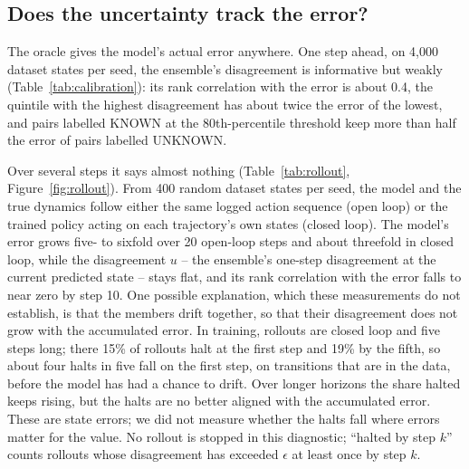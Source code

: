 \documentclass[11pt]{article}
\begin{document}
\subsection{Does the uncertainty track the error?}\label{sec:uncertainty}

The oracle gives the model's actual error anywhere. One step ahead, on 4{,}000 dataset states per seed, the ensemble's disagreement is informative but weakly (Table~\ref{tab:calibration}): its rank correlation with the error is about 0.4, the quintile with the highest disagreement has about twice the error of the lowest, and pairs labelled KNOWN at the 80th-percentile threshold keep more than half the error of pairs labelled UNKNOWN.

\begin{table}[h]
\centering\small
{}
\caption{One-step error of the hybrid ensemble against the true dynamics (Euclidean norm over the five process variables, normalized units), mean over seeds.}
\label{tab:calibration}
\end{table}

Over several steps it says almost nothing (Table~\ref{tab:rollout}, Figure~\ref{fig:rollout}). From 400 random dataset states per seed, the model and the true dynamics follow either the same logged action sequence (open loop) or the trained policy acting on each trajectory's own states (closed loop). The model's error grows five- to sixfold over 20 open-loop steps and about threefold in closed loop, while the disagreement $u$ -- the ensemble's one-step disagreement at the current predicted state -- stays flat, and its rank correlation with the error falls to near zero by step 10. One possible explanation, which these measurements do not establish, is that the members drift together, so that their disagreement does not grow with the accumulated error. In training, rollouts are closed loop and five steps long; there 15\% of rollouts halt at the first step and 19\% by the fifth, so about four halts in five fall on the first step, on transitions that are in the data, before the model has had a chance to drift. Over longer horizons the share halted keeps rising, but the halts are no better aligned with the accumulated error. These are state errors; we did not measure whether the halts fall where errors matter for the value. No rollout is stopped in this diagnostic; ``halted by step $k$'' counts rollouts whose disagreement has exceeded $\epsilon$ at least once by step $k$.
\end{document}
